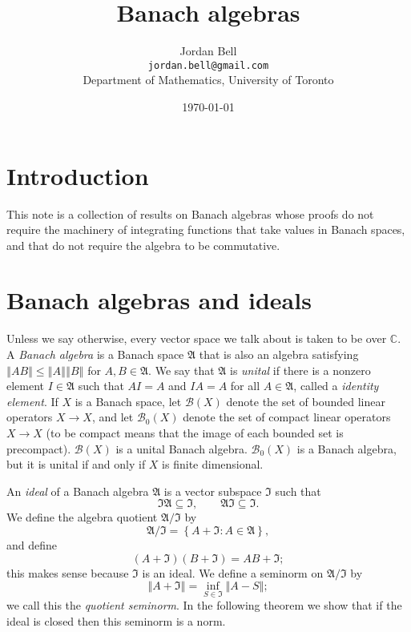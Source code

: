 \documentclass{article}
\newcommand{\norm}[1]{\left\Vert #1 \right\Vert}
\theoremstyle{definition}
\begin{document}
\title{Banach algebras}
\author{Jordan Bell\\ \texttt{jordan.bell@gmail.com}\\Department of Mathematics, University of Toronto}
\date{\today}

\maketitle

\section{Introduction}
This note is a collection of results on Banach algebras whose proofs do not require the machinery of integrating functions that take values in Banach spaces, and that
do not require the algebra to be commutative.

\section{Banach algebras and ideals}
Unless we say otherwise, every vector  space we talk about is taken to be over $\mathbb{C}$. A   {\em Banach algebra}  is a  Banach space $\mathfrak{A}$ that is also an algebra satisfying
 $\norm{AB} \leq \norm{A} \norm{B}$ for $A,B \in \mathfrak{A}$. We say that $\mathfrak{A}$ is {\em unital} if there is 
 a nonzero element $I \in \mathfrak{A}$ such that $AI=A$ and $IA=A$ for all $A \in \mathfrak{A}$, called a {\em identity element}. 
If $X$ is a Banach space,
let $\mathscr{B}(X)$ denote the set of bounded linear operators $X \to X$, and let $\mathscr{B}_0(X)$ denote the set of compact linear operators
$X \to  X$ (to be compact means that the image of each bounded set is precompact). $\mathscr{B}(X)$ is a unital Banach algebra. $\mathscr{B}_0(X)$ is a Banach algebra,
but it is unital if and only if $X$ is finite dimensional.
 
An {\em ideal} of a Banach algebra $\mathfrak{A}$ is a vector subspace $\mathfrak{I}$  such that
\[
\mathfrak{I}\mathfrak{A} \subseteq \mathfrak{I}, \qquad \mathfrak{A} \mathfrak{I} \subseteq \mathfrak{I}.
\]
We define the algebra quotient $\mathfrak{A} / \mathfrak{I}$ by 
\[
\mathfrak{A} / \mathfrak{I} = \left\{ A+\mathfrak{I}: A \in \mathfrak{A}\right\},
\]
and define
\[
(A+\mathfrak{I})(B+\mathfrak{I}) = AB+\mathfrak{I};
\]
this makes sense because $\mathfrak{I}$ is an ideal.
We define a seminorm on $\mathfrak{A}/\mathfrak{I}$ by 
\[
\norm{A+\mathfrak{I}} = \inf_{S \in \mathfrak{I}} \norm{A-S};
\]
we call this the {\em quotient seminorm}. In the following theorem we show that if the ideal is closed then this seminorm is a norm.
\end{document}
